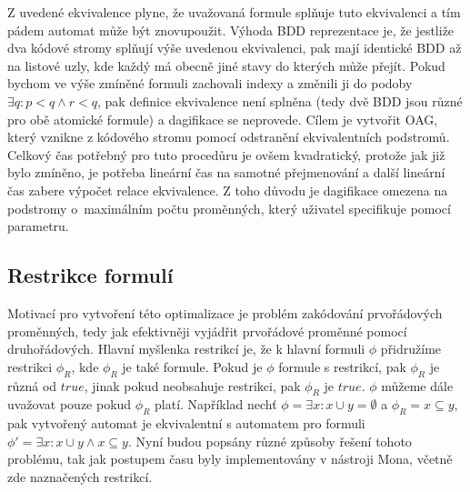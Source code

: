 Z uvedené ekvivalence plyne, že uvažovaná formule splňuje tuto ekvivalenci a tím pádem automat může být znovupoužit. Výhoda BDD reprezentace je, že jestliže dva kódové stromy splňují výše uvedenou ekvivalenci, pak mají identické BDD až na listové uzly, kde každý má obecně jiné stavy do kterých může přejít. Pokud bychom ve výše zmíněné formuli zachovali indexy a změnili ji do podoby $ \exists q: p < q \wedge r < q $, pak definice ekvivalence není splněna (tedy dvě BDD jsou různé pro obě atomické formule) a dagifikace se neprovede. Cílem je vytvořit OAG, který vznikne z kódového stromu pomocí odstranění ekvivalentních podstromů. Celkový čas potřebný pro tuto procedůru je ovšem kvadratický, protože jak již bylo zmíněno, je potřeba lineární čas na samotné přejmenování a další lineární čas zabere výpočet relace ekvivalence. Z toho důvodu je dagifikace omezena na podstromy o~maximálním počtu proměnných, který uživatel specifikuje pomocí parametru.


\subsection{Restrikce formulí}


Motivací pro vytvoření této optimalizace je problém zakódování prvořádových proměnných, tedy jak efektivněji vyjádřit prvořádové proměnné pomocí druhořádových. Hlavní myšlenka restrikcí je, že k hlavní formuli $\phi$ přidružíme restrikci $\phi_R$, kde $\phi_R$ je také formule. Pokud je $\phi$ formule s restrikcí, pak $\phi_R$ je různá od $true$, jinak pokud neobsahuje restrikci, pak $\phi_R$ je $true$. $\phi$ můžeme dále uvažovat pouze pokud $\phi_R$ platí. Například nechť $\phi = \exists x: x \cup y = \emptyset $ a $\phi_R=x\subseteq y$, pak vytvořený automat je ekvivalentní s automatem pro formuli $\phi'= \exists x: x \cup y \wedge x\subseteq y$. Nyní budou popsány různé způsoby řešení tohoto problému, tak jak postupem času byly implementovány v nástroji Mona, včetně zde naznačených restrikcí.

